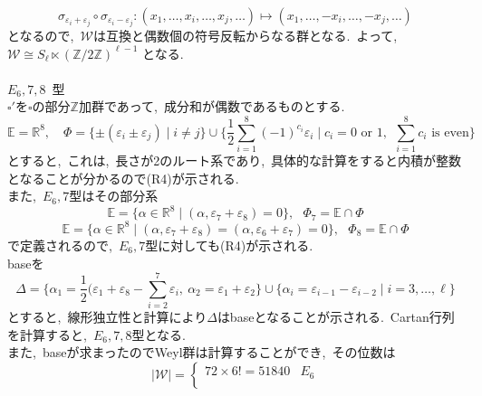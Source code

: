 \documentclass[uplatex,dvipdfmx]{jsarticle}
\begin{document}
\begin{myproof}
\begin{equation*}
        \sigma_{\varepsilon_i + \varepsilon_j} \circ \sigma_{\varepsilon_i - \varepsilon_j} : (x_1, \dots, x_i, \dots, x_j, \dots) \mapsto (x_1, \dots, -x_i, \dots, -x_j, \dots)
   \end{equation*}
   となるので,~$\mathscr{W}$は互換と偶数個の符号反転からなる群となる.~よって,~$\mathscr{W} \cong S_\ell \ltimes (\mathbb{Z}/2\mathbb{Z})^{\ell-1}$ となる.\\\\
    $E_6,7,8$~型\\
    $\square '$を$\square$の部分$\mathbb{Z}$加群であって,~成分和が偶数であるものとする.
    \begin{equation*}
        \mathbb{E} = \mathbb{R}^8, \quad \Phi = \{\pm (\varepsilon_i \pm \varepsilon_j) \mid i \neq j\} \cup \{\frac{1}{2}\sum_{i=1}^8 (-1)^{c_i} \varepsilon_i \mid c_i = 0 \text{ or } 1,~~\sum_{i=1}^8 c_i \text{ is even}\}
    \end{equation*}
    とすると,~これは,~長さが2のルート系であり,~具体的な計算をすると内積が整数となることが分かるので(R4)が示される.~\\
    また,~$E_6,7$型はその部分系
    \begin{equation*}
        \mathbb{E} = \{\alpha \in \mathbb{R}^8 \mid (\alpha, \varepsilon_7 + \varepsilon_8) = 0\},~~~\Phi_7 = \mathbb{E} \cap \Phi
    \end{equation*}
    \begin{equation*}
        \mathbb{E} = \{\alpha \in \mathbb{R}^8 \mid (\alpha, \varepsilon_7 + \varepsilon_8) = (\alpha,\varepsilon_6 +\varepsilon_7)= 0\},~~~\Phi_8 = \mathbb{E} \cap \Phi
    \end{equation*}
    で定義されるので,~$E_6,7$型に対しても(R4)が示される.~\\
    baseを
    \begin{equation*}
        \Delta = \{\alpha_1 = \frac{1}{2}(\varepsilon_1 + \varepsilon_8 - \sum_{i=2}^7 \varepsilon_i,~\alpha_2 = \varepsilon_1 + \varepsilon_2\} \cup \{\alpha_i = \varepsilon_{i-1} - \varepsilon_{i-2} \mid i = 3, \dots, \ell\}
    \end{equation*}
    とすると,~線形独立性と計算により$\Delta$はbaseとなることが示される.~Cartan行列を計算すると,~$E_6,7,8$型となる.~\\
    また,~baseが求まったのでWeyl群は計算することができ,~その位数は
    \begin{equation*}
        |\mathscr{W}| = \begin{cases}
            72 \times 6! = 51840 & E_6 \\

\end{cases}
\end{equation*}
\end{myproof}
\end{document}
